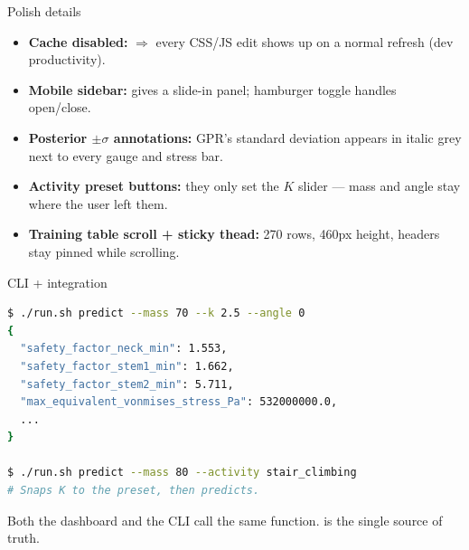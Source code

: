 \begin{frame}{Polish details}
  \begin{itemize}
    \item \textbf{Cache disabled:} 
          \(\Rightarrow\) every CSS/JS edit shows up on a normal refresh
          (dev productivity).
    \item \textbf{Mobile sidebar:}  gives a
          slide-in panel; hamburger toggle handles open/close.
    \item \textbf{Posterior \(\pm\sigma\) annotations:} GPR's standard
          deviation appears in italic grey next to every gauge and stress bar.
    \item \textbf{Activity preset buttons:} they only set the \(K\) slider
          --- mass and angle stay where the user left them.
    \item \textbf{Training table scroll + sticky thead:} 270 rows, 460px
          height, headers stay pinned while scrolling.
  \end{itemize}
\end{frame}

\begin{frame}[fragile]{CLI + integration}
\begin{lstlisting}[language=bash, basicstyle=\ttfamily\small]
$ ./run.sh predict --mass 70 --k 2.5 --angle 0
{
  "safety_factor_neck_min": 1.553,
  "safety_factor_stem1_min": 1.662,
  "safety_factor_stem2_min": 5.711,
  "max_equivalent_vonmises_stress_Pa": 532000000.0,
  ...
}

$ ./run.sh predict --mass 80 --activity stair_climbing
# Snaps K to the preset, then predicts.
\end{lstlisting}

  \vspace{0.4cm}
  Both the dashboard and the CLI call the same  function.
   is the \alert{single source of truth}.
\end{frame}

